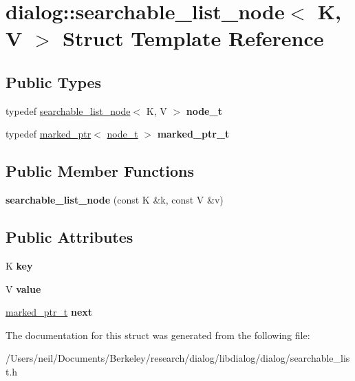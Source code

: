 \hypertarget{structdialog_1_1searchable__list__node}{}\section{dialog\+:\+:searchable\+\_\+list\+\_\+node$<$ K, V $>$ Struct Template Reference}
\label{structdialog_1_1searchable__list__node}
\subsection*{Public Types}
\begin{DoxyCompactItemize}
\item 
\mbox{\label{structdialog_1_1searchable__list__node_a3463e6f3cd91929320d053cc19e6393e}} 
typedef \hyperlink{structdialog_1_1searchable__list__node}{searchable\+\_\+list\+\_\+node}$<$ K, V $>$ {\bfseries node\+\_\+t}
\item 
\mbox{\label{structdialog_1_1searchable__list__node_a5c1d4463296140134d0edc3a925d20c4}} 
typedef \hyperlink{structdialog_1_1marked__ptr}{marked\+\_\+ptr}$<$ \hyperlink{structdialog_1_1searchable__list__node}{node\+\_\+t} $>$ {\bfseries marked\+\_\+ptr\+\_\+t}
\end{DoxyCompactItemize}
\subsection*{Public Member Functions}
\begin{DoxyCompactItemize}
\item 
\mbox{\label{structdialog_1_1searchable__list__node_aca8a75ddfa70b4363bf4f25503473027}} 
{\bfseries searchable\+\_\+list\+\_\+node} (const K \&k, const V \&v)
\end{DoxyCompactItemize}
\subsection*{Public Attributes}
\begin{DoxyCompactItemize}
\item 
\mbox{\label{structdialog_1_1searchable__list__node_a09f4b012b3f62af1c3e25d29ee18e2bd}} 
K {\bfseries key}
\item 
\mbox{\label{structdialog_1_1searchable__list__node_ae4a20a07ac1df29d977e4ae313de08ff}} 
V {\bfseries value}
\item 
\mbox{\label{structdialog_1_1searchable__list__node_a5d70ae1bdbbd2c519fc95101e5f48f03}} 
\hyperlink{structdialog_1_1marked__ptr}{marked\+\_\+ptr\+\_\+t} {\bfseries next}
\end{DoxyCompactItemize}


The documentation for this struct was generated from the following file\+:\begin{DoxyCompactItemize}
\item 
/\+Users/neil/\+Documents/\+Berkeley/research/dialog/libdialog/dialog/searchable\+\_\+list.\+h\end{DoxyCompactItemize}
